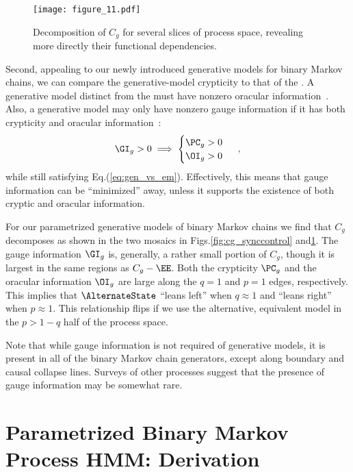 \documentclass[final,nofootinbib,aps,pre,twocolumn,showpacs,groupaddress,preprintnumbers,floatfix]{revtex4-1}
\newcommand{\Cg}{\ensuremath{C_g}\xspace}
\begin{document}
\begin{figure}
\centering
\texttt{[image: figure\_11.pdf]}
 \caption{Decomposition of \Cg for several slices of process space, revealing
	more directly their functional dependencies.
 }
 \label{fig:cg_slices}
\end{figure}

Second, appealing to our newly introduced generative models for binary Markov
chains, we can compare the generative-model crypticity to that of the \eM. A
generative model distinct from the \eM must have nonzero oracular
information~\cite{kamath2010new}. Also, a generative model may only have
nonzero gauge information if it has both crypticity and oracular
information~\cite{kamath2010new}:
\begin{align}
  \GI_g > 0  \implies
    \begin{cases}
      \PC_g > 0\\
      \OI_g > 0
    \end{cases}
  ~,
\end{align}
while still satisfying Eq.\nobreakspace \textup {(\ref {eq:gen_vs_em})}. Effectively, this means that gauge
information can be ``minimized'' away, unless it supports the existence of both
cryptic and oracular information.

For our parametrized generative models of binary Markov chains we find that \Cg
decomposes as shown in the two mosaics in Figs.\nobreakspace \ref {fig:cg_synccontrol} and\nobreakspace  \ref {fig:cg_slices}. The gauge information $\GI_g$ is,
generally, a rather small portion of \Cg, though it is largest in the same
regions as $\Cg - \EE$. Both the crypticity $\PC_g$ and the oracular
information $\OI_g$ are large along the $q=1$ and $p=1$ edges, respectively.
This implies that $\AlternateState$ ``leans left'' when $q \approx 1$ and
``leans right'' when $p \approx 1$. This relationship flips if we use the
alternative, equivalent model in the $p > 1 - q$ half of the process space.

Note that while gauge information is not required of generative models, it is
present in all of the binary Markov chain generators, except along boundary and
causal collapse lines. Surveys of other processes suggest that the presence of
gauge information may be somewhat rare.

\section{Parametrized Binary Markov Process HMM: Derivation}
\label{sec:derivation}
\end{document}
